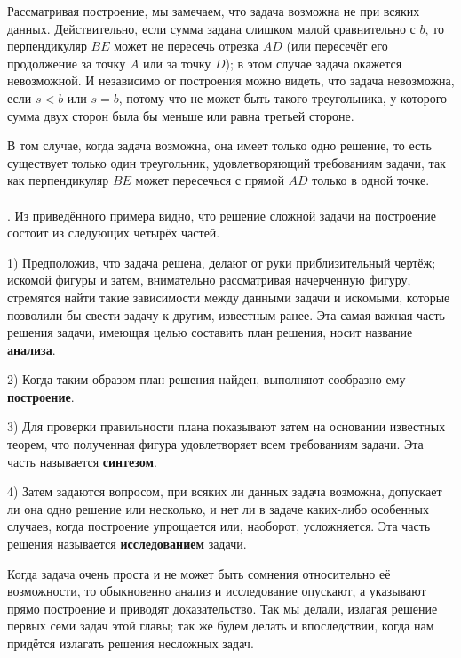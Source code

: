 \documentclass[oneside]{book}
\begin{document}
Рассматривая построение, мы замечаем, что задача возможна не при всяких данных.
Действительно, если сумма задана слишком малой сравнительно с $b$, то перпендикуляр $BE$ может не пересечь отрезка $AD$ (или пересечёт его продолжение за точку $A$ или за точку $D$);
в этом случае задача окажется невозможной.
И независимо от построения можно видеть, что задача невозможна, если $s<b$ или $s=b$, потому что не может быть такого треугольника, у которого сумма двух сторон была бы меньше или равна третьей стороне.

В том случае, когда задача возможна, она имеет только одно решение, то есть существует только один треугольник, удовлетворяющий требованиям задачи, так как перпендикуляр $BE$ может пересечься с прямой $AD$ только в одной точке.

\paragraph{}\label{1938/69}
.
Из приведённого примера видно, что решение сложной задачи на построение состоит из следующих четырёх частей.

1) Предположив, что задача решена, делают от руки приблизительный чертёж;
искомой фигуры и затем, внимательно рассматривая начерченную фигуру, стремятся найти такие зависимости между данными задачи и искомыми, которые позволили бы свести задачу к другим, известным ранее.
Эта самая важная часть решения задачи, имеющая целью составить план решения, носит название \textbf{анализа}.

2) Когда таким образом план решения найден, выполняют сообразно ему \textbf{построение}.

3) Для проверки правильности плана показывают затем на основании известных теорем, что полученная фигура удовлетворяет всем требованиям задачи.
Эта часть называется \textbf{синтезом}.

4) Затем задаются вопросом, при всяких ли данных задача возможна, допускает ли она одно решение или несколько, и нет ли в задаче каких-либо особенных случаев, когда построение упрощается или, наоборот, усложняется.
Эта часть решения называется \textbf{исследованием} задачи.

Когда задача очень проста и не может быть сомнения относительно её возможности, то обыкновенно анализ и исследование опускают, а указывают прямо построение и приводят доказательство.
Так мы делали, излагая решение первых семи задач этой главы;
так же будем делать и впоследствии, когда нам придётся излагать решения несложных задач.
\end{document}
